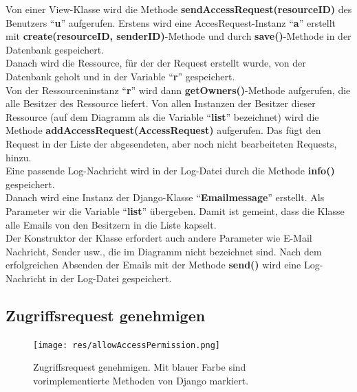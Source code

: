 \documentclass[parskip=full,11pt]{scrartcl}
\begin{document}
Von einer View-Klasse wird die Methode \textbf{sendAccessRequest(resourceID)} des Benutzers \enquote{\textbf{u}}  aufgerufen. Erstens wird eine AccesRequest-Instanz \enquote{\textbf{a}} erstellt mit \textbf{create(resourceID, senderID)}-Methode und durch \textbf{save()}-Methode in der Datenbank gespeichert. \\Danach wird die Ressource, für der der Request erstellt wurde, von der Datenbank geholt und in der Variable \enquote{\textbf{r}} gespeichert.\\Von der Ressourceninstanz \enquote{\textbf{r}} wird dann \textbf{getOwners()}-Methode aufgerufen, die alle Besitzer des Ressource liefert. Von allen Instanzen der Besitzer dieser Ressource (auf dem Diagramm als die Variable \enquote{\textbf{list}} bezeichnet) wird die Methode \textbf{addAccessRequest(AccessRequest)} aufgerufen. Das fügt den Request in der Liste der abgesendeten, aber noch nicht bearbeiteten Requests, hinzu.\\Eine passende Log-Nachricht wird in der Log-Datei durch die Methode \textbf{info()} gespeichert.\\Danach wird eine Instanz der Django-Klasse \enquote{\textbf{Emailmessage}} erstellt. Als Parameter wir die Variable \enquote{\textbf{list}} übergeben. Damit ist gemeint, dass die Klasse alle Emails von den Besitzern in die Liste kapselt.\\Der Konstruktor der Klasse erfordert auch andere Parameter wie E-Mail Nachricht, Sender usw., die im Diagramm nicht bezeichnet sind. Nach dem erfolgreichen Absenden der Emails mit der Methode \textbf{send()} wird eine Log-Nachricht in der Log-Datei gespeichert. 
 
  \newpage
 \subsection{Zugriffsrequest genehmigen}
 \begin{figure}[ht!]
 	\centering
 	\texttt{[image: res/allowAccessPermission.png]}
 	\caption{Zugriffsrequest genehmigen. Mit blauer Farbe sind vorimplementierte Methoden von Django markiert.}
 	 	\label{fig:allowAccPerm}
 \end{figure}
 
\end{document}
